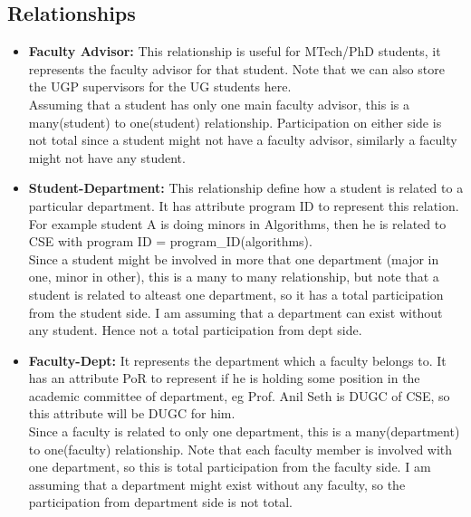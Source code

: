 \documentclass[a4paper]{article}
\begin{document}
\subsection*{Relationships}
\begin{itemize}
	\item{\textbf{Faculty Advisor:}} This relationship is useful for MTech/PhD students, it represents
	the faculty advisor for that student.
	Note that we can also store the UGP supervisors for the UG students here. \\
	Assuming that a student has only one main faculty advisor, this is a many(student) to one(student) relationship.
	Participation on either side is not total since a student might not have a faculty advisor,
	similarly a faculty might not have any student.

	\item{\textbf{Student-Department:}} This relationship define how a student is related to a particular department.
	It has attribute program ID to represent this relation. For example student A is doing minors in
	Algorithms, then he is related to CSE with program ID = program\_ID(algorithms). \\
	Since a student might be involved in more that one department (major in one, minor in other),
	this is a many to many relationship, but note that a student is related to alteast one department,
	so it has a total participation from the student side. I am assuming that a department can exist without any student.
	Hence not a total participation from dept side.

	\item{\textbf{Faculty-Dept:}} It represents the department which a faculty belongs to. 
	It has an attribute PoR to represent if he is holding some position in the academic committee of department,
	eg Prof. Anil Seth is DUGC of CSE, so this attribute will be DUGC for him. \\
	Since a faculty is related to only one department, this is a many(department) to one(faculty) relationship.
	Note that each faculty member is involved with one department, so this is total participation from the faculty side.
	I am assuming that a department might exist without any faculty, so the participation from department side is not total.


\end{itemize}
\end{document}
